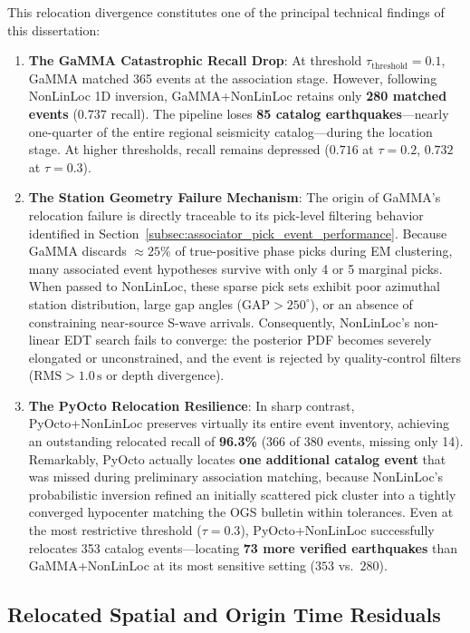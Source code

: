 This relocation divergence constitutes one of the principal technical findings of this dissertation:
\begin{enumerate}
  \item \textbf{The GaMMA Catastrophic Recall Drop}: At threshold $\tau_{\mathrm{threshold}} = 0.1$, GaMMA matched 365 events at the association stage. However, following NonLinLoc 1D inversion, GaMMA+NonLinLoc retains only \textbf{280 matched events} ($0.737$ recall). The pipeline loses \textbf{85 catalog earthquakes}---nearly one-quarter of the entire regional seismicity catalog---during the location stage. At higher thresholds, recall remains depressed ($0.716$ at $\tau=0.2$, $0.732$ at $\tau=0.3$).
  \item \textbf{The Station Geometry Failure Mechanism}: The origin of GaMMA's relocation failure is directly traceable to its pick-level filtering behavior identified in Section~\ref{subsec:associator_pick_event_performance}. Because GaMMA discards $\approx 25\%$ of true-positive phase picks during EM clustering, many associated event hypotheses survive with only 4 or 5 marginal picks. When passed to NonLinLoc, these sparse pick sets exhibit poor azimuthal station distribution, large gap angles ($\mathrm{GAP} > 250^\circ$), or an absence of constraining near-source S-wave arrivals. Consequently, NonLinLoc's non-linear EDT search fails to converge: the posterior PDF becomes severely elongated or unconstrained, and the event is rejected by quality-control filters ($\mathrm{RMS} > 1.0\,\unit{\second}$ or depth divergence).
  \item \textbf{The PyOcto Relocation Resilience}: In sharp contrast, PyOcto+NonLinLoc preserves virtually its entire event inventory, achieving an outstanding relocated recall of \textbf{96.3\%} (366 of 380 events, missing only 14). Remarkably, PyOcto actually locates \textbf{one additional catalog event} that was missed during preliminary association matching, because NonLinLoc's probabilistic inversion refined an initially scattered pick cluster into a tightly converged hypocenter matching the OGS bulletin within tolerances. Even at the most restrictive threshold ($\tau=0.3$), PyOcto+NonLinLoc successfully relocates 353 catalog events---locating \textbf{73 more verified earthquakes} than GaMMA+NonLinLoc at its most sensitive setting ($353$ vs.\ $280$).
\end{enumerate}

\subsection{Relocated Spatial and Origin Time Residuals}
\label{subsec:relocated_residuals}

